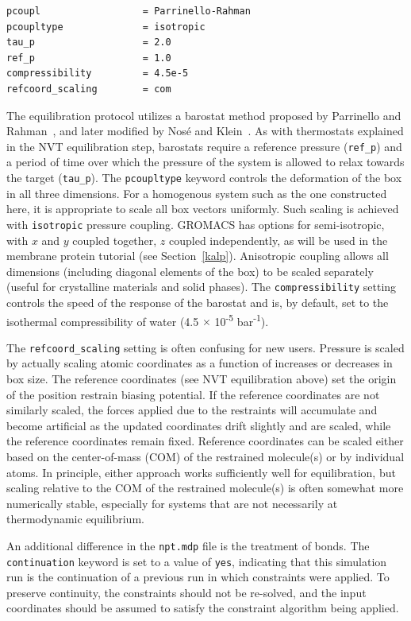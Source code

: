 \documentclass[9pt,tutorial,pubversion]{livecoms}
\begin{document}
\begin{lstlisting}
pcoupl                  = Parrinello-Rahman
pcoupltype              = isotropic
tau_p                   = 2.0
ref_p                   = 1.0
compressibility         = 4.5e-5
refcoord_scaling        = com
\end{lstlisting}

The equilibration protocol utilizes a barostat method proposed by Parrinello and Rahman~\cite{Parrinello1981}, and later modified by Nos\'e and Klein~\cite{Nose1983}. As with thermostats explained in the NVT equilibration step, barostats require a reference pressure (\texttt{ref\_p}) and a period of time over which the pressure of the system is allowed to relax towards the target (\texttt{tau\_p}). The \texttt{pcoupltype} keyword controls the deformation of the box in all three dimensions. For a homogenous system such as the one constructed here, it is appropriate to scale all box vectors uniformly. Such scaling is achieved with \texttt{isotropic} pressure coupling. GROMACS has options for semi-isotropic, with $x$ and $y$ coupled together, $z$ coupled independently, as will be used in the membrane protein tutorial (see Section~\ref{kalp}). Anisotropic coupling allows all dimensions (including diagonal elements of the box) to be scaled separately (useful for crystalline materials and solid phases). The \texttt{compressibility} setting controls the speed of the response of the barostat and is, by default, set to the isothermal compressibility of water (4.5 $\times$ 10\textsuperscript{-5} bar\textsuperscript{-1}). 

The \texttt{refcoord\_scaling} setting is often confusing for new users. Pressure is scaled by actually scaling atomic coordinates as a function of increases or decreases in box size. The reference coordinates (see NVT equilibration above) set the origin of the position restrain biasing potential. If the reference coordinates are not similarly scaled, the forces applied due to the restraints will accumulate and become artificial as the updated coordinates drift slightly and are scaled, while the reference coordinates remain fixed. Reference coordinates can be scaled either based on the center-of-mass (COM) of the restrained molecule(s) or by individual atoms. In principle, either approach works sufficiently well for equilibration, but scaling relative to the COM of the restrained molecule(s) is often somewhat more numerically stable, especially for systems that are not necessarily at thermodynamic equilibrium.

An additional difference in the \texttt{npt.mdp} file is the treatment of bonds. The \texttt{continuation} keyword is set to a value of \texttt{yes}, indicating that this simulation run is the continuation of a previous run in which constraints were applied. To preserve continuity, the constraints should not be re-solved, and the input coordinates should be assumed to satisfy the constraint algorithm being applied.
\end{document}

